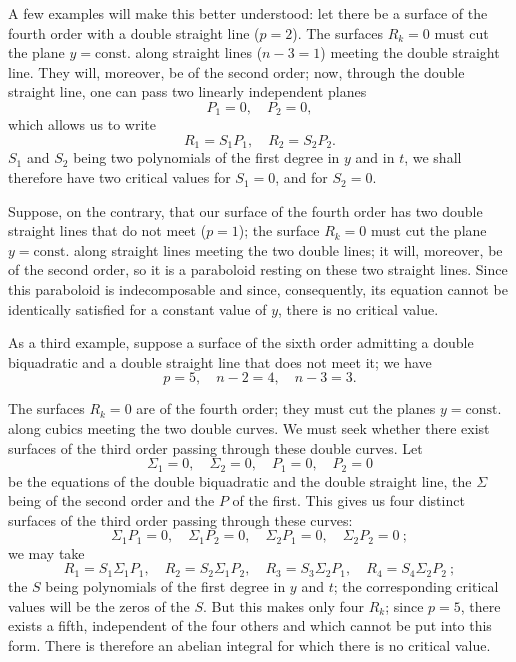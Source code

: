 \documentclass{article}
\begin{document}
A few examples will make this better understood: let there be a surface of the fourth order with a double straight line ($p = 2$). The surfaces $R_{k} = 0$ must cut the plane $y = \text{const.}$ along straight lines ($n - 3 = 1$) meeting the double straight line. They will, moreover, be of the second order; now, through the double straight line, one can pass two linearly independent planes
\[
P_{1} = 0, \quad P_{2} = 0,
\]
which allows us to write
\[
R_{1} = S_{1} P_{1}, \quad R_{2} = S_{2} P_{2}.
\]
$S_{1}$ and $S_{2}$ being two polynomials of the first degree in $y$ and in $t$, we shall therefore have two critical values for $S_{1} = 0$, and for $S_{2} = 0$.

Suppose, on the contrary, that our surface of the fourth order has two double straight lines that do not meet ($p = 1$); the surface $R_{k} = 0$ must cut the plane $y = \text{const.}$ along straight lines meeting the two double lines; it will, moreover, be of the second order, so it is a paraboloid resting on these two straight lines. Since this paraboloid is indecomposable and since, consequently, its equation cannot be identically satisfied for a constant value of $y$, there is no critical value.

As a third example, suppose a surface of the sixth order admitting a double biquadratic and a double straight line that does not meet it; we have
\[
p = 5, \quad n - 2 = 4, \quad n - 3 = 3.
\]

The surfaces $R_{k} = 0$ are of the fourth order; they must cut the planes $y = \text{const.}$ along cubics meeting the two double curves. We must seek whether there exist surfaces of the third order passing through these double curves. Let
\[
\Sigma_{1} = 0, \quad \Sigma_{2} = 0, \quad P_{1} = 0, \quad P_{2} = 0
\]
be the equations of the double biquadratic and the double straight line, the $\Sigma$ being of the second order and the $P$ of the first. This gives us four distinct surfaces of the third order passing through these curves:
\[
\Sigma_{1} P_{1} = 0, \quad \Sigma_{1} P_{2} = 0, \quad \Sigma_{2} P_{1} = 0, \quad \Sigma_{2} P_{2} = 0~;
\]
we may take
\[
R_{1} = S_{1} \Sigma_{1} P_{1}, \quad R_{2} = S_{2} \Sigma_{1} P_{2}, \quad R_{3} = S_{3} \Sigma_{2} P_{1}, \quad R_{4} = S_{4} \Sigma_{2} P_{2}~;
\]
the $S$ being polynomials of the first degree in $y$ and $t$; the corresponding critical values will be the zeros of the $S$. But this makes only four $R_{k}$; since $p = 5$, there exists a fifth, independent of the four others and which cannot be put into this form. There is therefore an abelian integral for which there is no critical value.
\end{document}
